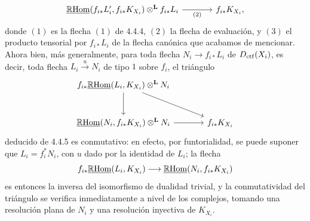 \begin{prooftext}[Demostración]
\begin{equation}
\begin{tikzcd}[column sep=large,row sep=large]
\uRHom(f_{i*}L'_i,f_{i*}K_{X_i})\otimes^{\mathbf L} f_{i*}L_i
 \arrow[r,"(2)"'] &
f_{i*}K_{X_i},
\end{tikzcd}
\end{equation}
donde $(1)$ es la flecha $(1)$ de 4.4.4, $(2)$ la flecha de evaluación, y $(3)$ el producto tensorial por $f_{i*}L_i$ de la flecha canónica que acabamos de mencionar. Ahora bien, más generalmente, para toda flecha $N_i\longrightarrow f_{i*}L_i$ de $D_{\mathrm{ctf}}(X_i)$, es decir, toda flecha $L_i\xrightarrow{u}N_i$ de tipo $1$ sobre $f_i$, el triángulo
\[
\begin{tikzcd}[column sep=large,row sep=large]
f_{i*}\uRHom(L_i,K_{X_i})\otimes^{\mathbf L}N_i
 \arrow[dr] \arrow[d] & \\
\uRHom(N_i,f_{i*}K_{X_i})\otimes^{\mathbf L}N_i \arrow[r] &
f_{i*}K_{X_i}
\end{tikzcd}
\]
deducido de 4.4.5 es conmutativo: en efecto, por funtorialidad, se puede suponer que $L_i=f_i^*N_i$, con $u$ dado por la identidad de $L_i$; la flecha
\[
f_{i*}\underline{\mathbb{R}\mathrm{Hom}}(L_i,K_{X_i})\longrightarrow\underline{\mathbb{R}\mathrm{Hom}}(N_i,f_{i*}K_{X_i})
\]
es entonces la inversa del isomorfismo de dualidad trivial, y la conmutatividad del triángulo se verifica inmediatamente a nivel de los complejos, tomando una resolución plana de $N_i$ y una resolución inyectiva de $K_{X_i}$.


\end{prooftext}
